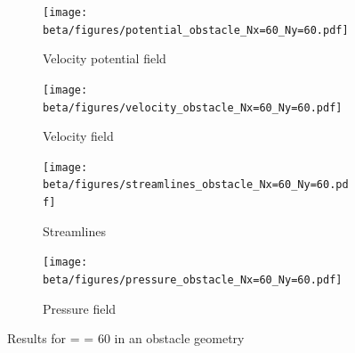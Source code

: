 \newpage

\begin{figure}[htbp]
      \centering
      \begin{subfigure}{.45\textwidth}
            \texttt{[image: beta/figures/potential\_obstacle\_Nx=60\_Ny=60.pdf]}
            \caption{Velocity potential field}\label{fig:vel_pot_field_ob}
      \end{subfigure}
      \begin{subfigure}{.45\textwidth}
            \texttt{[image: beta/figures/velocity\_obstacle\_Nx=60\_Ny=60.pdf]}
            \caption{Velocity field}\label{fig:velocity_field_ob}
      \end{subfigure}

      \centering
      \begin{subfigure}{.45\textwidth}
            \texttt{[image: beta/figures/streamlines\_obstacle\_Nx=60\_Ny=60.pdf]}
            \caption{Streamlines}\label{fig:streamlines_ob}
      \end{subfigure}
      \begin{subfigure}{.45\textwidth}
            \texttt{[image: beta/figures/pressure\_obstacle\_Nx=60\_Ny=60.pdf]}
            \caption{Pressure field}\label{fig:pressure_field_ob}
      \end{subfigure}
      \caption{Results for  =  = \num{60} in an obstacle geometry}
\end{figure}

\newpage

